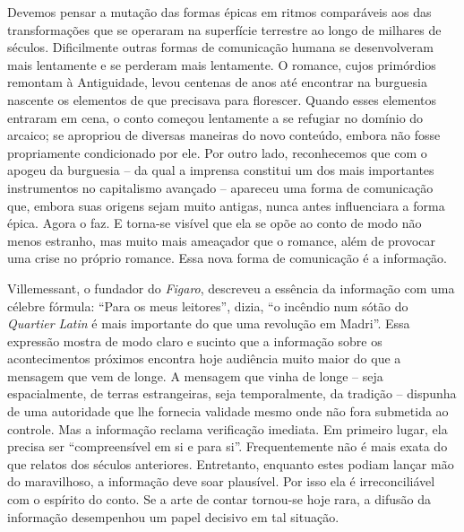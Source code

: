 Devemos pensar a mutação das formas épicas em ritmos comparáveis aos das
transformações que se operaram na superfície terrestre ao longo de
milhares de séculos. Dificilmente outras formas de comunicação humana se
desenvolveram mais lentamente e se perderam mais lentamente. O romance,
cujos primórdios remontam à Antiguidade, levou centenas de anos até
encontrar na burguesia nascente os elementos de que precisava para
florescer. Quando esses elementos entraram em cena, o conto começou
lentamente a se refugiar no domínio do arcaico; se apropriou de diversas
maneiras do novo conteúdo, embora não fosse propriamente condicionado
por ele. Por outro lado, reconhecemos que com o apogeu da burguesia --
da qual a imprensa constitui um dos mais importantes instrumentos no
capitalismo avançado -- apareceu uma forma de comunicação que, embora
suas origens sejam muito antigas, nunca antes influenciara a forma
épica. Agora o faz. E torna-se visível que ela se opõe ao conto de modo
não menos estranho, mas muito mais ameaçador que o romance, além de
provocar uma crise no próprio romance. Essa nova forma de comunicação é
a informação.

Villemessant, o fundador do \emph{Figaro}, descreveu a essência da
informação com uma célebre fórmula: ``Para os meus leitores'', dizia,
``o incêndio num sótão do \emph{Quartier Latin} é mais importante do que
uma revolução em Madri''. Essa expressão mostra de modo claro e sucinto
que a informação sobre os acontecimentos próximos encontra hoje 
audiência muito maior do que a mensagem que vem de longe. A mensagem que
vinha de longe -- seja espacialmente, de terras estrangeiras, seja
temporalmente, da tradição -- dispunha de uma autoridade que lhe
fornecia validade mesmo onde não fora submetida ao controle. Mas a
informação reclama verificação imediata. Em primeiro lugar, ela precisa
ser ``compreensível em si e para si''. Frequentemente não é mais exata
do que relatos dos séculos anteriores. Entretanto, enquanto estes podiam
lançar mão do maravilhoso, a informação deve soar plausível. Por isso
ela é irreconciliável com o espírito do conto. Se a arte de contar
tornou-se hoje rara, a difusão da informação desempenhou um papel
decisivo em tal situação.


